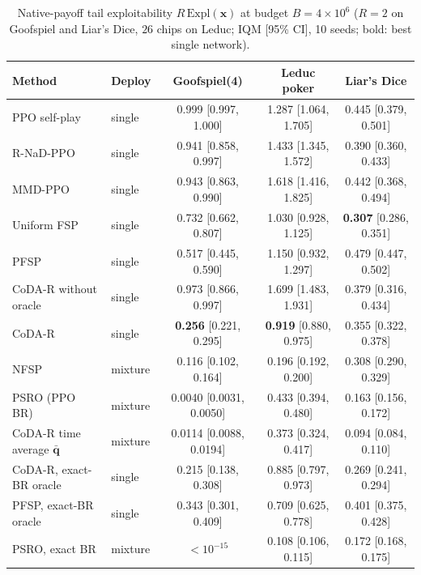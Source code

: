 \documentclass{article}
\theoremstyle{plain}
\theoremstyle{remark}
\newcommand{\Expl}{\mathrm{Expl}}
\newcommand{\bx}{{\bm{x}}}
\newcommand{\bq}{{\bm{q}}}
\newcommand{\codar}{CoDA-R}
\newcommand{\rnad}{R-NaD-PPO}
\begin{document}
\begin{table}[t]
\caption{Native-payoff tail exploitability $R\,\Expl(\bx)$ at budget $B=4\times10^6$ ($R=2$ on Goofspiel and Liar's Dice, $26$ chips on Leduc; IQM [95\% CI], 10 seeds; bold: best single network).}
\label{tab:main}
\begin{center}
\scriptsize
\setlength{\tabcolsep}{3pt}
\begin{tabular}{llccc}
\toprule
Method & Deploy & Goofspiel(4) & Leduc poker & Liar's Dice \\
\midrule
PPO self-play & single & 0.999 [0.997, 1.000] & 1.287 [1.064, 1.705] & 0.445 [0.379, 0.501] \\
\rnad{} & single & 0.941 [0.858, 0.997] & 1.433 [1.345, 1.572] & 0.390 [0.360, 0.433] \\
MMD-PPO & single & 0.943 [0.863, 0.990] & 1.618 [1.416, 1.825] & 0.442 [0.368, 0.494] \\
Uniform FSP & single & 0.732 [0.662, 0.807] & 1.030 [0.928, 1.125] & \textbf{0.307} [0.286, 0.351] \\
PFSP & single & 0.517 [0.445, 0.590] & 1.150 [0.932, 1.297] & 0.479 [0.447, 0.502] \\
\codar{} without oracle & single & 0.973 [0.866, 0.997] & 1.699 [1.483, 1.931] & 0.379 [0.316, 0.434] \\
\codar{} & single & \textbf{0.256} [0.221, 0.295] & \textbf{0.919} [0.880, 0.975] & 0.355 [0.322, 0.378] \\
\midrule
NFSP & mixture & 0.116 [0.102, 0.164] & 0.196 [0.192, 0.200] & 0.308 [0.290, 0.329] \\
PSRO (PPO BR) & mixture & 0.0040 [0.0031, 0.0050] & 0.433 [0.394, 0.480] & 0.163 [0.156, 0.172] \\
\codar{} time average $\bar{\bq}$ & mixture & 0.0114 [0.0088, 0.0194] & 0.373 [0.324, 0.417] & 0.094 [0.084, 0.110] \\
\midrule
\codar{}, exact-BR oracle & single & 0.215 [0.138, 0.308] & 0.885 [0.797, 0.973] & 0.269 [0.241, 0.294] \\
PFSP, exact-BR oracle & single & 0.343 [0.301, 0.409] & 0.709 [0.625, 0.778] & 0.401 [0.375, 0.428] \\
PSRO, exact BR & mixture & $<10^{-15}$ & 0.108 [0.106, 0.115] & 0.172 [0.168, 0.175] \\
\bottomrule
\end{tabular}
\end{center}
\end{table}
\end{document}
